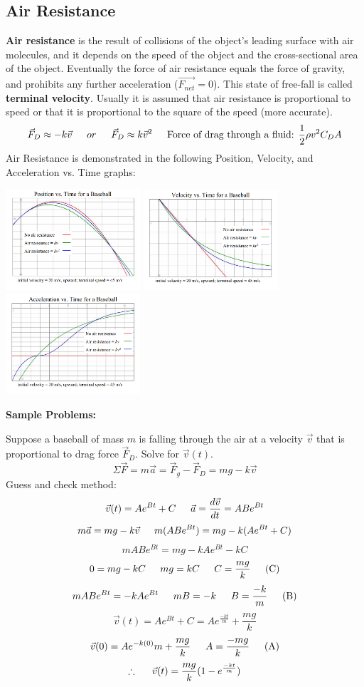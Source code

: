 \documentclass{article}
\begin{document}
\subsection{Air Resistance}
\textbf{Air resistance} is the result of collisions of the object's leading surface with air molecules, and it depends on the speed of the object and the cross-sectional area of the object. Eventually the force of air resistance equals the force of gravity, and prohibits any further acceleration ($\vec{F_{net}}=0$). This state of free-fall is called \textbf{terminal velocity}. Usually it is assumed that air resistance is proportional to speed or that it is proportional to the square of the speed (more accurate).
\[
\vec{F}_{D}\approx -k\vec{v} \indent or \indent \vec{F}_{D}\approx k\vec{v}^2
\indent \text{Force of drag through a fluid: } \frac{1}{2}\rho v^2 C_D A
\]
Air Resistance is demonstrated in the following Position, Velocity, and Acceleration vs. Time graphs:\\
\centerline{
  \includegraphics[width=5cm]{pvt_air.png}
  \includegraphics[width=5cm]{vvt_air.png}
  \includegraphics[width=5cm]{avt_air.png}
}
\textbf{Sample Problems:}
\begin{multicols}{2}
  Suppose a baseball of mass $m$ is falling through the air at a velocity $\vec{v}$ that is proportional to drag force $\vec{F}_D$. Solve for $\vec{v}(t)$.
  \[
  \Sigma\vec{F}=m\vec{a}=\vec{F}_g-\vec{F}_D=mg-k\vec{v}
  \]
  Guess and check method:
  \[
  \vec{v}(t)=Ae^{Bt}+C \indent \vec{a}=\frac{d\vec{v}}{dt}=ABe^{Bt}
  \]
  \[
  m\vec{a}=mg-k\vec{v} \indent m(ABe^{Bt})=mg-k(Ae^{Bt}+C)
  \]
  \[
  mABe^{Bt}=mg-kAe^{Bt}-kC
  \]
  \columnbreak
  \[
  0=mg-kC \indent mg=kC \indent C=\frac{mg}{k} \indent \text{(C)}
  \]
  \[
  mABe^{Bt}=-kAe^{Bt} \indent mB=-k \indent B=\frac{-k}{m} \indent \text{(B)}
  \]
  \[
  \vec{v}(t)=Ae^{Bt}+C=Ae^{\frac{-kt}{m}}+\frac{mg}{k}
  \]
  \[
  \vec{v}(0)=Ae^{-k(0)}{m}+\frac{mg}{k} \indent A=\frac{-mg}{k} \indent \text{(A)}
  \]
  \[
  \therefore \indent \vec{v}(t)=\frac{mg}{k}(1-e^{\frac{-kt}{m}})
  \]
\end{multicols}
\end{document}
